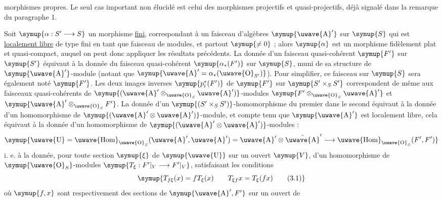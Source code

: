 morphismes propres. Le seul cas important non élucidé est celui des morphismes
projectifs et quasi-projectifs, déjà signalé dans la remarque du paragraphe 1.

 Soit $\symup{\alpha:S'\longrightarrow S}$ un morphisme \uline{fini}, correspondant à un
faisceau d'algèbres $\symup{\text{\uwave{A}}'}$ sur $\symup{S}$ qui est \uline{localement libre} de type fini
en tant que faisceau de modules, et partout $\symup{\ne0}$ ; alors $\symup{\alpha}$ est un
morphisme fidèlement plat et quasi-compact, auquel on peut donc appliquer les
résultats précédents. La donnée d'un faisceau quasi-cohérent $\symup{F'}$ sur $\symup{S'}$
équivaut à la donnée du faisceau quasi-cohérent $\symup{\alpha_*(F')}$ sur $\symup{S}$, muni de
sa structure de $\symup{\text{\uwave{A}}'}$-module (notant que
$\symup{\text{\uwave{A}}'=\alpha_*(\text{\uwave{O}}_{S'})}$). Pour simplifier, ce faisceau sur $\symup{S}$
sera également noté $\symup{F'}$. Les deux images inverses $\symup{p_i^*(F')}$ de $\symup{F'}$ sur
$\symup{S'\times_SS'}$ correspondent de même aux faisceaux quasi-cohérents de
$\symup{(\text{\uwave{A}}'\otimes_{\text{\uwave{O}}_S}\text{\uwave{A}}')}$-modules
$\symup{F'\otimes_{\text{\uwave{O}}_S}\text{\uwave{A}}'}$ et $\symup{\text{\uwave{A}}'\otimes_{\text{\uwave{O}}_S}F'}$.
La donnée d'un $\symup{(S'\times_SS')}$-homomorphisme du premier dans le second équivaut
à la donnée d'un homomorphisme de
$\symup{(\text{\uwave{A}}'\otimes\text{\uwave{A}}')}$-module, et compte tenu que
$\symup{\text{\uwave{A}}'}$ est localement libre, cela équivaut à la donnée d'un
homomorphisme de $\symup{(\text{\uwave{A}}'\otimes\text{\uwave{A}}')}$-modules :
\[
  \symup{\text{\uwave{U}}=
  \mathop{\text{\uwave{Hom}}}\nolimits_{\text{\uwave{O}}_S}(\text{\uwave{A}}',\text{\uwave{A}}')
  =\text{\uwave{A}}'\otimes\check{\text{\uwave{A}}}'
  \longrightarrow
  \mathop{\text{\uwave{Hom}}}\nolimits_{\text{\uwave{O}}_S}(F',F')}
\]
i. e. à la donnée, pour toute section $\symup{\xi}$ de $\symup{\text{\uwave{U}}}$ sur un ouvert $\symup{V}$,
d'un homomorphisme de $\symup{\text{\uwave{O}}_S}$-modules
$\symup{T_\xi:F'|_V\longrightarrow F'|_V}$, satisfaisant les conditions
\begin{equation}
  \symup{T_{f\xi}(x)=fT_\xi(x)
  \qquad T_{\xi f}x=T_\xi(fx)
  \tag{3.1}}
\end{equation}
où $\symup{f,x}$ sont respectivement des sections de $\symup{\text{\uwave{A}}',F'}$ sur un ouvert de
